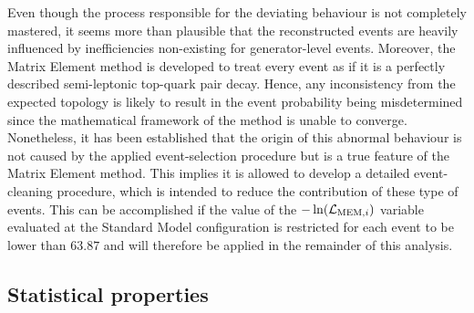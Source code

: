 Even though the process responsible for the deviating behaviour is not completely mastered, it seems more than plausible that the reconstructed events are heavily influenced by inefficiencies non-existing for generator-level events. Moreover, the Matrix Element method is developed to treat every event as if it is a perfectly described semi-leptonic top-quark pair decay. 
Hence, any inconsistency from the expected topology is likely to result in the event probability being misdetermined since the mathematical framework of the method is unable to converge.
Nonetheless, it has been established that the origin of this abnormal behaviour is not caused by the applied event-selection procedure but is a true feature of the Matrix Element method.
This implies it is allowed to develop a detailed event-cleaning procedure, which is intended to reduce the contribution of these type of events.
This can be accomplished if the value of the $-\ln(\mathcal{L}_{\textrm{MEM}, i})$ variable evaluated at the Standard Model configuration is restricted for each event to be lower than $63.87$ and will therefore be applied in the remainder of this analysis.

\subsection{Statistical properties}

